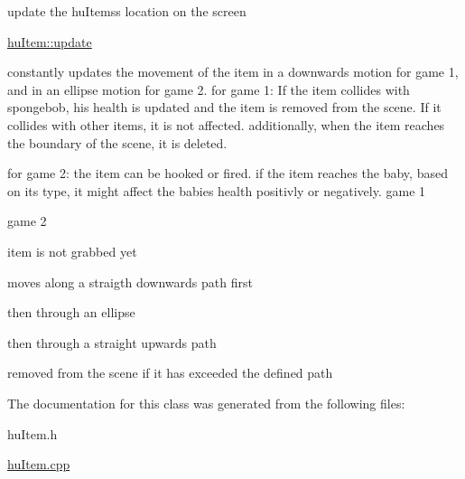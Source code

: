 update the hu\-Itemss location on the screen 

\hyperlink{classhuItem_a3737ba343f040fed15febc7ef3e5ad52}{hu\-Item\-::update}

constantly updates the movement of the item in a downwards motion for game 1, and in an ellipse motion for game 2. for game 1\-: If the item collides with spongebob, his health is updated and the item is removed from the scene. If it collides with other items, it is not affected. additionally, when the item reaches the boundary of the scene, it is deleted.

for game 2\-: the item can be hooked or fired. if the item reaches the baby, based on its type, it might affect the babies health positivly or negatively. game 1

game 2

item is not grabbed yet

moves along a straigth downwards path first

then through an ellipse

then through a straight upwards path

removed from the scene if it has exceeded the defined path 

The documentation for this class was generated from the following files\-:\begin{DoxyCompactItemize}
\item 
hu\-Item.\-h\item 
\hyperlink{huItem_8cpp}{hu\-Item.\-cpp}\end{DoxyCompactItemize}

